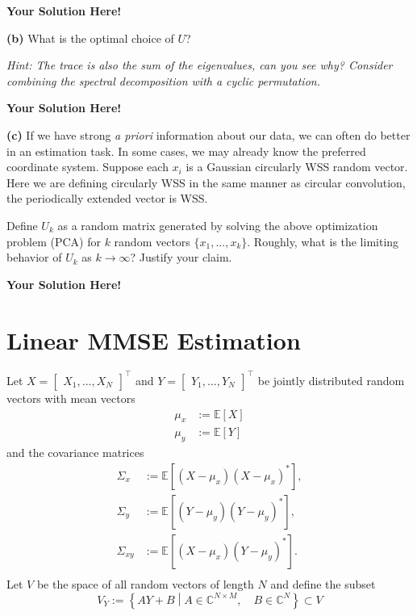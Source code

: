 \documentclass[12pt]{article}
\newcommand{\expect}[1]{\mathbb{E}\left[#1\right]}
\newcommand{\0}{\mathbf{0}}
\newcommand{\1}{\mathbf{1}}
\newcommand{\solspace}{\vspace{3mm} \textbf{Your Solution Here!} \vspace{3mm}}
\begin{document}
\solspace

\textbf{(b)} What is the optimal choice of $U$?

\textit{Hint: The trace is also the sum of the eigenvalues, can you see why? Consider combining the spectral decomposition with a cyclic permutation.}

\solspace



\textbf{(c)}
If we have strong \textit{a priori} information about our data, we can often do better in an estimation task.
In some cases, we may already know the preferred coordinate system.
Suppose each $x_i$ is a Gaussian circularly WSS random vector.
Here we are defining circularly WSS in the same manner as circular convolution, the periodically extended vector is WSS.

Define $U_k$ as a random matrix generated by solving the above optimization problem (PCA) for $k$ random vectors $\{x_1,...,x_k\}$. Roughly, what is the limiting behavior of $U_k$ as $k \rightarrow \infty$? Justify your claim.

\solspace

\pagebreak
\section{Linear MMSE Estimation}
Let $X = \begin{bmatrix}
    X_1, ..., X_N
\end{bmatrix}^\top$ and $Y = \begin{bmatrix}
    Y_1, ..., Y_N
\end{bmatrix}^\top$ be jointly distributed random vectors with mean vectors
\begin{align}
    \mu_x &:= \expect{X} \\
    \mu_y &:= \expect{Y}
\end{align}
and the covariance matrices
\begin{align}
    \Sigma_x &:= \expect{(X-\mu_x)(X-\mu_x)^*}, \\
    \Sigma_y &:= \expect{(Y-\mu_y)(Y-\mu_y)^*}, \\
    \Sigma_{xy} &:= \expect{(X-\mu_x)(Y-\mu_y)^*}. \\
\end{align}
Let $V$ be the space of all random vectors of length $N$ and define the subset
\begin{equation}
    V_Y := \left\{AY + B \middle|A \in \mathbb{C}^{N \times M}, \quad B \in \mathbb{C}^N \right\} \subset V
\end{equation}
\end{document}
